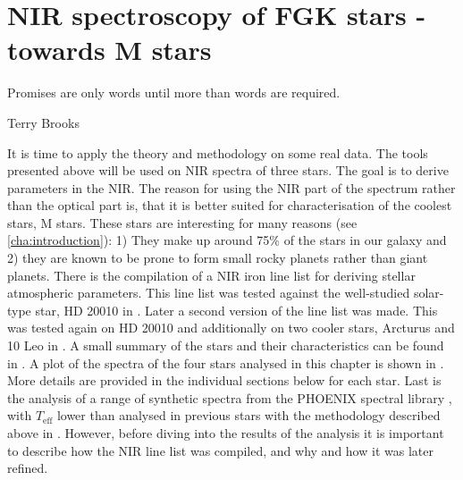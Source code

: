 
\chapter{NIR spectroscopy of FGK stars - towards M stars}
\label{cha:results}
\epigraph{Promises are only words until more than words are required.}{Terry Brooks}

It is time to apply the theory and methodology on some real data. The tools presented above will be
used on NIR spectra of three stars. The goal is to derive parameters in the NIR. The reason for
using the NIR part of the spectrum rather than the optical part is, that it is better suited for
characterisation of the coolest stars, M stars. These stars are interesting for many reasons (see
\cref{cha:introduction}): 1) They make up around 75\% of the stars in our galaxy and 2) they are
known to be prone to form small rocky planets rather than giant planets. There is the compilation of
a NIR iron line list for deriving stellar atmospheric parameters. This line list was tested against
the well-studied solar-type star, HD 20010 in \citet{Andreasen2016}. Later a second version of the
line list was made. This was tested again on HD 20010 and additionally on two cooler stars, Arcturus
and 10 Leo in \citet{Andreasen2017b}. A small summary of the stars and their characteristics can be
found in . A plot of the spectra of the four stars analysed in this chapter is shown
in . More details are provided in the individual sections below for each star.
Last is the analysis of a range of synthetic spectra from the PHOENIX spectral library
\citep{Husser2013}, with $T_\mathrm{eff}$ lower than analysed in previous stars with the methodology
described above in . However, before diving into the results of the analysis it
is important to describe how the NIR line list was compiled, and why and how it was later refined.

